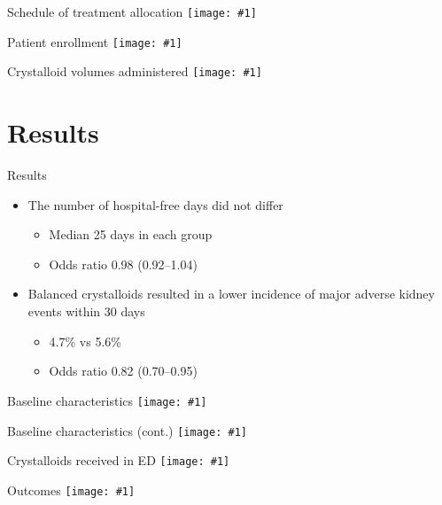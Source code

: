 \documentclass{beamer}
\newcommand*{\solo}[1]{\centering\texttt{[image: \#1]}}
\begin{document}
\begin{frame}{Schedule of treatment allocation}
    \solo{S1.eps}
\end{frame}

\begin{frame}{Patient enrollment}
    \solo{S2.eps}
\end{frame}

\begin{frame}{Crystalloid volumes administered}
    \solo{S3.eps}
\end{frame}

\section{Results}
\begin{frame}{Results}
    \begin{itemize}
        \item The number of hospital-free days did not differ
            \begin{itemize}
                \item Median 25 days in each group
                \item Odds ratio 0.98 (0.92--1.04)
            \end{itemize}
        \item Balanced crystalloids resulted in a lower incidence of major adverse kidney events within 30 days
            \begin{itemize}
                \item 4.7\% vs 5.6\%
                \item Odds ratio 0.82 (0.70--0.95)
            \end{itemize}
    \end{itemize}
\end{frame}

\begin{frame}{Baseline characteristics}
    \solo{T1a.eps}
\end{frame}

\begin{frame}{Baseline characteristics (cont.)}
    \solo{T1b.eps}
\end{frame}

\begin{frame}{Crystalloids received in ED}
    \solo{T2.eps}
\end{frame}

\begin{frame}{Outcomes}
    \solo{T3.eps}
\end{frame}
\end{document}
